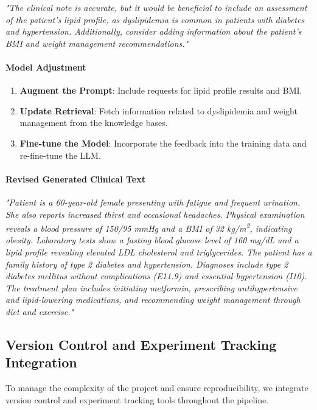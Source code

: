 \documentclass[12pt, a4paper]{article}
\begin{document}
\textit{"The clinical note is accurate, but it would be beneficial to include an assessment of the patient's lipid profile, as dyslipidemia is common in patients with diabetes and hypertension. Additionally, consider adding information about the patient's BMI and weight management recommendations."}

\paragraph{Model Adjustment}

\begin{enumerate}
    \item \textbf{Augment the Prompt}: Include requests for lipid profile results and BMI.
    \item \textbf{Update Retrieval}: Fetch information related to dyslipidemia and weight management from the knowledge bases.
    \item \textbf{Fine-tune the Model}: Incorporate the feedback into the training data and re-fine-tune the LLM.
\end{enumerate}

\paragraph{Revised Generated Clinical Text}

\textit{"Patient is a 60-year-old female presenting with fatigue and frequent urination. She also reports increased thirst and occasional headaches. Physical examination reveals a blood pressure of 150/95 mmHg and a BMI of 32 kg/m\textsuperscript{2}, indicating obesity. Laboratory tests show a fasting blood glucose level of 160 mg/dL and a lipid profile revealing elevated LDL cholesterol and triglycerides. The patient has a family history of type 2 diabetes and hypertension. Diagnoses include type 2 diabetes mellitus without complications (E11.9) and essential hypertension (I10). The treatment plan includes initiating metformin, prescribing antihypertensive and lipid-lowering medications, and recommending weight management through diet and exercise."}

\subsection{Version Control and Experiment Tracking Integration}

To manage the complexity of the project and ensure reproducibility, we integrate version control and experiment tracking tools throughout the pipeline.
\end{document}
